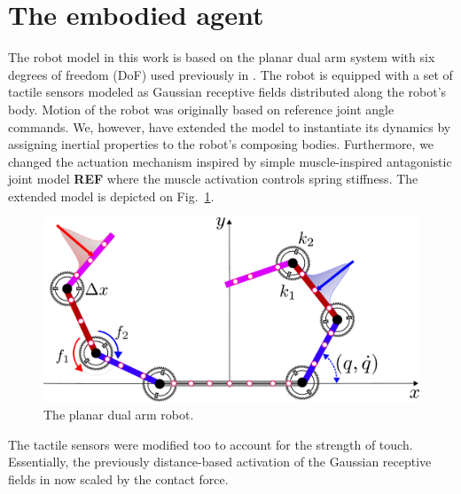 \section{The embodied agent}
The robot model in this work is based on the planar dual arm system with six degrees of freedom (DoF) used previously in \cite{Mannella2018Knowyourbody, Marcel2022Learningreachown}. The robot is equipped with a set of tactile sensors modeled as Gaussian receptive fields distributed along the robot's body. Motion of the robot was originally based on reference joint angle commands. We, however, have extended the model to instantiate its dynamics by assigning inertial properties to the robot's composing bodies. Furthermore, we changed the actuation mechanism inspired by simple muscle-inspired antagonistic joint model \textbf{REF} where the muscle activation controls spring stiffness. The extended model is depicted on Fig.~\ref{fig:extended_dual_arm_robot}.
\begin{figure}[!t]
	\begin{center}
		\hspace*{\fill}
		\includegraphics[width=0.99\columnwidth]{extended_dual_arm_robot.pdf}
		\hspace*{\fill}
	\end{center}
	\caption{\label{fig:extended_dual_arm_robot} The planar dual arm robot.}
\end{figure}

The tactile sensors were modified too to account for the strength of touch. Essentially, the previously distance-based activation of the Gaussian receptive fields in now scaled by the contact force.

